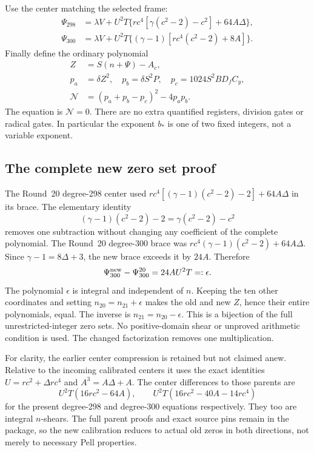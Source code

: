 Use the center matching the selected frame:
\begin{align}
 \Psi_{298}&=\lambda V+U^2T
 \{rc^4[\gamma(c^2-2)-c^2]+64A\Delta\},\nonumber\\
 \Psi_{300}&=\lambda V+U^2T
 \{(\gamma-1)[rc^4(c^2-2)+8A]\}.\label{eq:new-integer-centers}
\end{align}
Finally define the ordinary polynomial
\begin{align}
 Z&=S(n+\Psi)-A_c,\nonumber\\
 p_a&=\delta Z^2,\quad p_b=\delta S^2P,\quad
 p_c=1024S^2BD_fC_y,\nonumber\\
 \mathcal N&=(p_a+p_b-p_c)^2-4p_ap_b.\label{eq:new-integer-norm}
\end{align}
The equation is $\mathcal N=0$. There are no extra quantified registers,
division gates or radical gates. In particular the exponent $b_*$ is
one of two fixed integers, not a variable exponent.

\subsection{The complete new zero set proof}
The Round~20 degree-298 center used
$rc^4[(\gamma-1)(c^2-2)-2]+64A\Delta$ in its brace.
The elementary identity
\[
 (\gamma-1)(c^2-2)-2=\gamma(c^2-2)-c^2
\]
removes one subtraction without changing any coefficient of the
complete polynomial.
The Round~20 degree-300 brace was
$rc^4(\gamma-1)(c^2-2)+64A\Delta$.
Since $\gamma-1=8\Delta+3$, the new brace exceeds it by $24A$.
Therefore
\[
 \Psi_{300}^{\rm new}-\Psi_{300}^{20}=24AU^2T=:\epsilon.
\]
The polynomial $\epsilon$ is integral and independent of $n$.
Keeping the ten other coordinates and setting
$n_{20}=n_{21}+\epsilon$ makes the old and new $Z$, hence their
entire polynomials, equal. The inverse is $n_{21}=n_{20}-\epsilon$.
This is a bijection of the full unrestricted-integer zero sets.
No positive-domain shear or unproved arithmetic condition is used.
The changed factorization removes one multiplication.

For clarity, the earlier center compression is retained but not claimed
anew. Relative to the incoming calibrated centers it uses the exact
identities $U=rc^2+\Delta rc^4$ and $A^3=A\Delta+A$.
The center differences to those parents are
\[
 U^2T(16rc^2-64A),\qquad
 U^2T(16rc^2-40A-14rc^4)
\]
for the present degree-298 and degree-300 equations respectively.
They too are integral $n$-shears. The full parent proofs and exact source
pins remain in the package, so the new calibration reduces to actual
old zeros in both directions, not merely to necessary Pell properties.

